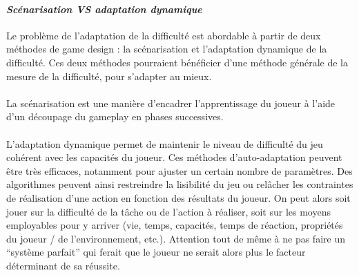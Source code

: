 			\paragraph{\emph{Scénarisation VS adaptation dynamique} \\ \quad}
Le problème de l’adaptation de la difficulté est abordable à partir de deux méthodes de game design : la scénarisation et l’adaptation dynamique de la difficulté.  Ces deux méthodes pourraient bénéficier d’une méthode générale de la mesure de la difficulté, pour s’adapter au mieux.

\paragraph{}La scénarisation est une manière d’encadrer l’apprentissage du joueur à l’aide d’un découpage du gameplay en phases successives. 

\paragraph{}L’adaptation dynamique permet de maintenir le niveau de difficulté du jeu cohérent avec les capacités du joueur. Ces méthodes d’auto-adaptation peuvent être très efficaces, notamment pour ajuster un certain nombre de paramètres. Des algorithmes peuvent ainsi restreindre la lisibilité du jeu ou relâcher les contraintes de réalisation d’une action en fonction des résultats du joueur. On peut alors soit jouer sur la difficulté de la tâche ou de l’action à réaliser, soit sur les moyens employables pour y arriver (vie, temps, capacités, temps de réaction, propriétés du joueur / de l’environnement, etc.). Attention tout de même à ne pas faire un “système parfait” qui ferait que le joueur ne serait alors plus le facteur déterminant de sa réussite.

